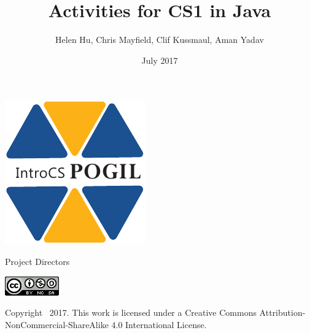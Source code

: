 \documentclass[12pt,twoside,openright]{report}
\title{Activities for CS1 in Java}
\author{Helen Hu, Chris Mayfield, Clif Kussmaul, Aman Yadav}
\date{July 2017}
\begin{document}
\begin{titlepage}
\centering

\vspace*{8em}
\includegraphics{IntroCS.pdf}

\makeatletter

\vspace*{4em}
\huge \textbf{\@title}

\vspace*{2em}
\large Project Directors

\vspace*{2pt}
\large \@author

\vspace*{2em}
\Large \@date

\makeatother

\normalsize

\vspace*{5em}
\includegraphics{by-nc-sa.png}

\vspace*{1ex}
Copyright \textcopyright\ 2017.
This work is licensed under a Creative Commons Attribution-NonCommercial-ShareAlike 4.0 International License.

\end{titlepage}

\doublespacing
\tableofcontents
\singlespacing


\cleardoublepage{}
{}


\cleardoublepage{}
{}

\end{document}
